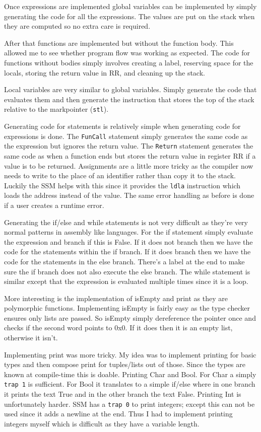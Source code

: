 \documentclass{article}
\begin{document}
Once expressions are implemented global variables can be implemented by simply generating the code for all the expressions. The values are put on the stack when they are computed so no extra care is required.

After that functions are implemented but without the function body. This allowed me to see whether program flow was working as expected. The code for functions without bodies simply involves creating a label, reserving space for the locals, storing the return value in RR, and cleaning up the stack.

Local variables are very similar to global variables. Simply generate the code that evaluates them and then generate the instruction that stores the top of the stack relative to the markpointer (\texttt{stl}).

Generating code for statements is relatively simple when generating code for expressions is done. The \texttt{FunCall} statement simply generates the same code as the expression but ignores the return value. The \texttt{Return} statement generates the same code as when a function ends but stores the return value in register RR if a value is to be returned. Assignments are a little more tricky as the compiler now needs to write to the place of an identifier rather than copy it to the stack. Luckily the SSM helps with this since it provides the \texttt{ldla} instruction which loads the address instead of the value. The same error handling as before is done if a user creates a runtime error.

Generating the if/else and while statements is not very difficult as they're very normal patterns in assembly like languages. For the if statement simply evaluate the expression and branch if this is False. If it does not branch then we have the code for the statements within the if branch. If it does branch then we have the code for the statements in the else branch. There's a label at the end to make sure the if branch does not also execute the else branch. The while statement is similar except that the expression is evaluated multiple times since it is a loop.

More interesting is the implementation of isEmpty and print as they are polymorphic functions. Implementing isEmpty is fairly easy as the type checker ensures only lists are passed. So isEmpty simply dereference the pointer once and checks if the second word points to 0x0. If it does then it is an empty list, otherwise it isn't.

Implementing print was more tricky. My idea was to implement printing for basic types and then compose print for tuples/lists out of those. Since the types are known at compile-time this is doable. Printing Char and Bool. For Char a simply \texttt{trap 1} is sufficient. For Bool it translates to a simple if/else where in one branch it prints the text True and in the other branch the text False. Printing Int is unfortunately harder. SSM has a \texttt{trap 0} to print integers; except this can not be used since it adds a newline at the end. Thus I had to implement printing integers myself which is difficult as they have a variable length.
\end{document}
